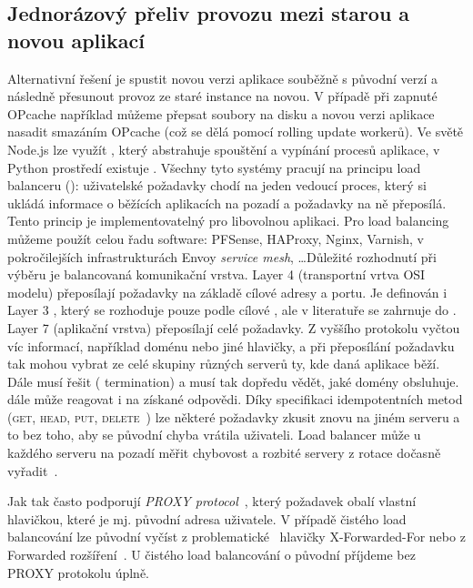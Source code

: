         \subsection*{Jednorázový přeliv provozu mezi starou a novou aplikací}
            \label{deploy-v-jedne-instanci}
            Alternativní řešení je spustit novou verzi aplikace souběžně s původní verzí a následně přesunout provoz ze staré instance na novou. V případě  při zapnuté OPcache například můžeme přepsat soubory na disku a novou verzi aplikace nasadit smazáním OPcache (což se dělá pomocí rolling update  workerů). Ve světě Node.js lze využít , který abstrahuje spouštění a vypínání procesů aplikace, v Python prostředí existuje . Všechny tyto systémy pracují na principu load balanceru (): uživatelské požadavky chodí na jeden vedoucí proces, který si ukládá informace o běžících aplikacích na pozadí a požadavky na ně přeposílá. Tento princip je implementovatelný pro libovolnou aplikaci. Pro load balancing můžeme použít celou řadu software: PFSense, HAProxy, Nginx, Varnish, v pokročilejších infrastrukturách Envoy \textit{service mesh}, \ldots Důležité rozhodnutí při výběru  je balancovaná komunikační vrstva. Layer 4 (transportní vrtva OSI modelu)  přeposílají  požadavky na základě cílové  adresy a portu. Je definován i Layer 3 , který se rozhoduje pouze podle cílové , ale v literatuře se zahrnuje do . Layer 7 (aplikační vrstva)  přeposílají celé \HTTP požadavky. Z vyššího protokolu vyčtou víc informací, například doménu nebo jiné hlavičky, a při přeposílání požadavku tak mohou vybrat ze celé skupiny různých serverů ty, kde daná aplikace běží. Dále   musí řešit  ( termination) a musí tak dopředu vědět, jaké domény obsluhuje.   dále může reagovat i na získané \HTTP odpovědi. Díky \HTTP specifikaci idempotentních metod (\textsc{get}, \textsc{head}, \textsc{put}, \textsc{delete}~\cite{http-idempotent}) lze některé požadavky zkusit znovu na jiném serveru a to bez toho, aby se původní chyba vrátila uživateli. Load balancer může u každého serveru na pozadí měřit chybovost a rozbité servery z rotace dočasně vyřadit~\cite{nginx-circuit-breaker}.

            Jak  tak   často podporují \textit{PROXY protocol}~\cite{tarreau-proxyprotocol}, který požadavek obalí vlastní hlavičkou, které je mj. původní  adresa uživatele. V případě čistého  load balancování lze původní  vyčíst z problematické~\cite{hansen-xforwardedfor} hlavičky X-Forwarded-For nebo z Forwarded rozšíření~\cite{http-forwarded}. U čistého  load balancování o původní  příjdeme bez PROXY protokolu úplně.

